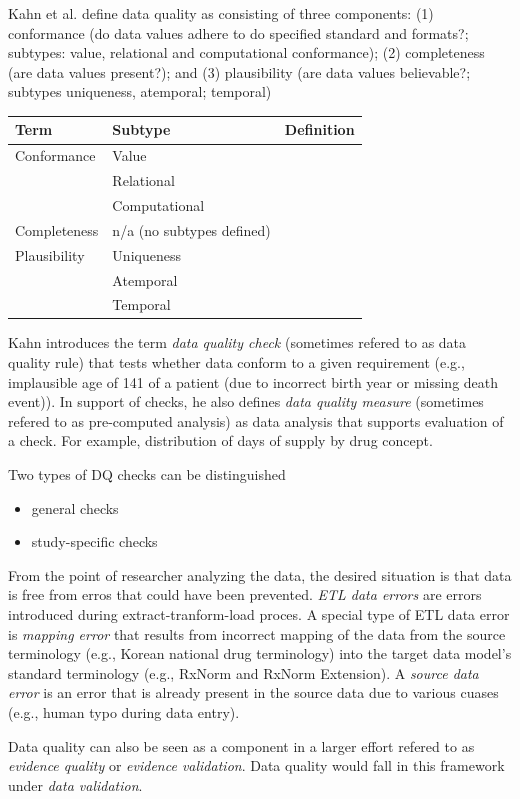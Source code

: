 \documentclass[]{book}
\providecommand{\tightlist}{%
  \setlength{\itemsep}{0pt}\setlength{\parskip}{0pt}}
\begin{document}
Kahn et al. define data quality as consisting of three components: (1)
conformance (do data values adhere to do specified standard and
formats?; subtypes: value, relational and computational conformance);
(2) completeness (are data values present?); and (3) plausibility (are
data values believable?; subtypes uniqueness, atemporal; temporal)
\citep{kahn_harmonized_2016}

\begin{longtable}[]{@{}lll@{}}
\toprule
Term & Subtype & Definition\tabularnewline
\midrule
\endhead
Conformance & Value &\tabularnewline
& Relational &\tabularnewline
& Computational &\tabularnewline
Completeness & n/a (no subtypes defined) &\tabularnewline
Plausibility & Uniqueness &\tabularnewline
& Atemporal &\tabularnewline
& Temporal &\tabularnewline
\bottomrule
\end{longtable}

Kahn introduces the term \emph{data quality check} (sometimes refered to
as data quality rule) that tests whether data conform to a given
requirement (e.g., implausible age of 141 of a patient (due to incorrect
birth year or missing death event)). In support of checks, he also
defines \emph{data quality measure} (sometimes refered to as
pre-computed analysis) as data analysis that supports evaluation of a
check. For example, distribution of days of supply by drug concept.

Two types of DQ checks can be distinguished\citep{weiskopf_methods_2013}

\begin{itemize}
\tightlist
\item
  general checks
\item
  study-specific checks
\end{itemize}

From the point of researcher analyzing the data, the desired situation
is that data is free from erros that could have been prevented.
\emph{ETL data errors} are errors introduced during
extract-tranform-load proces. A special type of ETL data error is
\emph{mapping error} that results from incorrect mapping of the data
from the source terminology (e.g., Korean national drug terminology)
into the target data model's standard terminology (e.g., RxNorm and
RxNorm Extension). A \emph{source data error} is an error that is
already present in the source data due to various cuases (e.g., human
typo during data entry).

Data quality can also be seen as a component in a larger effort refered
to as \emph{evidence quality} or \emph{evidence validation}. Data
quality would fall in this framework under \emph{data validation}.
\end{document}
